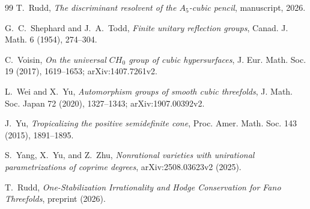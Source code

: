 \documentclass[11pt]{article}
\numberwithin{equation}{section}
\theoremstyle{definition}
\theoremstyle{remark}
\begin{document}
\begin{thebibliography}{99}
T.~Rudd,
\emph{The discriminant resolvent of the \(A_5\)-cubic pencil},
manuscript, 2026.

G.~C.~Shephard and J.~A.~Todd,
\emph{Finite unitary reflection groups},
Canad. J. Math. 6 (1954), 274--304.

C.~Voisin,
\emph{On the universal \(CH_0\) group of cubic hypersurfaces},
J. Eur. Math. Soc. 19 (2017), 1619--1653; arXiv:1407.7261v2.

L.~Wei and X.~Yu,
\emph{Automorphism groups of smooth cubic threefolds},
J. Math. Soc. Japan 72 (2020), 1327--1343; arXiv:1907.00392v2.

J.~Yu,
\emph{Tropicalizing the positive semidefinite cone},
Proc. Amer. Math. Soc. 143 (2015), 1891--1895.

S.~Yang, X.~Yu, and Z.~Zhu,
\emph{Nonrational varieties with unirational parametrizations of coprime
degrees}, arXiv:2508.03623v2 (2025).

T.~Rudd,
\emph{One-Stabilization Irrationality and Hodge Conservation for Fano Threefolds},
preprint (2026).

\end{thebibliography}
\end{document}
